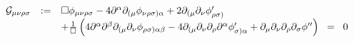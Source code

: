 \begin{equation}
  \begin{array}{rcl}
  {\cal{G}}_{\mu\nu\rho\sigma} &:=& \square \phi_{\mu\nu\rho\sigma} - 4 
\partial^{\alpha} \partial_{( \mu} \phi_{\nu\rho\sigma ) \alpha} + 2 
\partial_{( \mu} \partial_{\nu} {\phi}^{\prime}_{\rho\sigma )} \\
  &&+ \frac{1}{\square} \left( 4 \partial^{\alpha} \partial^{\beta} 
\partial_{( \mu} \partial_{\nu} \phi_{\rho\sigma ) \alpha\beta} - 4 
\partial_{( \mu} \partial_{\nu} \partial_{\rho} \partial^{\alpha} 
\phi^{\prime}_{\sigma ) \alpha} + \partial_{\mu} \partial_{\nu} 
\partial_{\rho} \partial_{\sigma} \phi^{\prime\prime}\right) \;\; =\;\; 
0 \\
  \end{array}
\label{eq:c1}
\end{equation}

